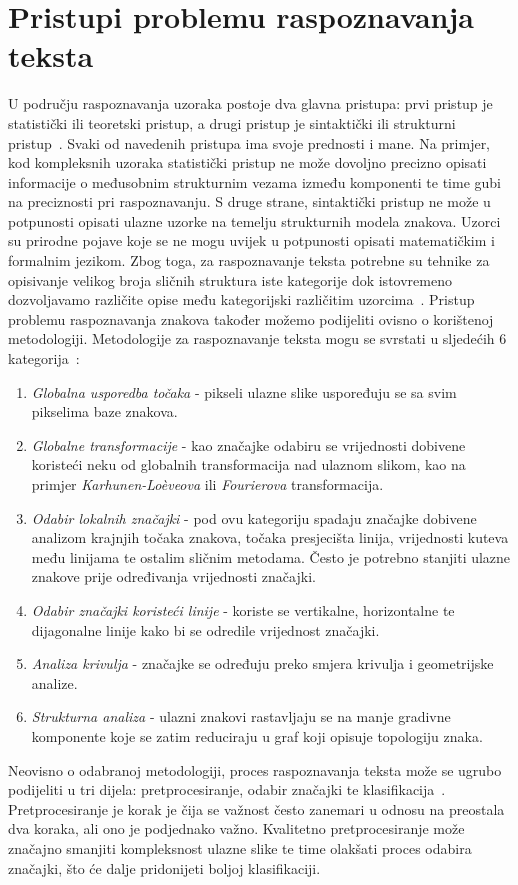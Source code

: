 \section{Pristupi problemu raspoznavanja teksta}
\label{sec:pristupi-problemu-raspoznavanja-teksta}
U području raspoznavanja uzoraka postoje dva glavna pristupa: prvi pristup je statistički ili teoretski pristup, a drugi
pristup je sintaktički ili strukturni pristup\ \citep{govindan1989}. Svaki od navedenih pristupa ima svoje prednosti i
mane. Na primjer, kod kompleksnih uzoraka statistički pristup ne može dovoljno precizno opisati informacije o međusobnim
strukturnim vezama između komponenti te time gubi na preciznosti pri raspoznavanju. S druge strane, sintaktički pristup
ne može u potpunosti opisati ulazne uzorke na temelju strukturnih modela znakova. Uzorci su prirodne pojave koje se ne
mogu uvijek u potpunosti opisati matematičkim i formalnim jezikom. Zbog toga, za raspoznavanje teksta potrebne su
tehnike za opisivanje velikog broja sličnih struktura iste kategorije dok istovremeno dozvoljavamo različite opise
među kategorijski različitim uzorcima\ \citep{govindan1989}. Pristup problemu raspoznavanja znakova također možemo
podijeliti ovisno o korištenoj metodologiji. Metodologije za raspoznavanje teksta mogu se svrstati u sljedećih 6
kategorija\ \citep{mantas1986}:
\begin{enumerate}
    \item \emph{Globalna usporedba točaka} - pikseli ulazne slike uspoređuju se sa svim pikselima baze znakova.
    \item \emph{Globalne transformacije} - kao značajke odabiru se vrijednosti dobivene koristeći neku od globalnih
    transformacija nad ulaznom slikom, kao na primjer \emph{Karhunen-Loèveova} ili \emph{Fourierova} transformacija.
    \item \emph{Odabir lokalnih značajki} - pod ovu kategoriju spadaju značajke dobivene analizom krajnjih točaka
    znakova, točaka presjecišta linija, vrijednosti kuteva među linijama te ostalim sličnim metodama. Često je potrebno
    stanjiti ulazne znakove prije određivanja vrijednosti značajki.
    \item \emph{Odabir značajki koristeći linije} - koriste se vertikalne, horizontalne te dijagonalne linije kako bi
    se odredile vrijednost značajki.
    \item \emph{Analiza krivulja} - značajke se određuju preko smjera krivulja i geometrijske analize.
    \item \emph{Strukturna analiza} - ulazni znakovi rastavljaju se na manje gradivne komponente koje se zatim
    reduciraju u graf koji opisuje topologiju znaka.
\end{enumerate}
Neovisno o odabranoj metodologiji, proces raspoznavanja teksta može se ugrubo podijeliti u tri dijela: pretprocesiranje,
odabir značajki te klasifikacija\ \citep{mori1999}. Pretprocesiranje je korak je čija se važnost često zanemari u odnosu
na preostala dva koraka, ali ono je podjednako važno. Kvalitetno pretprocesiranje može značajno smanjiti kompleksnost
ulazne slike te time olakšati proces odabira značajki, što će dalje pridonijeti boljoj klasifikaciji.



